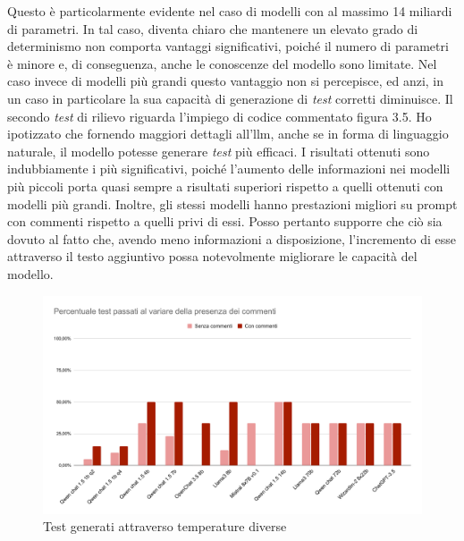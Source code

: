     Questo è particolarmente evidente nel caso di modelli con al massimo 14 miliardi di parametri. 
    In tal caso, diventa chiaro che mantenere un elevato grado di determinismo non comporta vantaggi significativi, 
    poiché il numero di parametri è minore e, di conseguenza, anche le conoscenze del modello sono limitate. Nel caso invece 
    di modelli più grandi questo vantaggio non si percepisce, ed anzi, in un caso in particolare la sua capacità di generazione di \textit{test} corretti diminuisce.
    Il secondo \textit{test} di rilievo riguarda l'impiego di codice commentato figura 3.5. Ho ipotizzato che fornendo maggiori dettagli all'\gls{llm}, 
    anche se in forma di linguaggio naturale, il modello potesse generare \textit{test} più efficaci. I risultati ottenuti sono indubbiamente 
    i più significativi, poiché l'aumento delle informazioni nei modelli più piccoli porta quasi sempre a risultati superiori rispetto 
    a quelli ottenuti con modelli più grandi. Inoltre, gli stessi modelli hanno prestazioni migliori su prompt con commenti rispetto a
     quelli privi di essi. Posso pertanto supporre che ciò sia dovuto al fatto che, avendo meno informazioni a disposizione, l'incremento di esse 
     attraverso il testo aggiuntivo possa notevolmente migliorare le capacità del modello.
    \begin{figure}[!h]
        \centering        
        \includegraphics[width=14.5cm]{img/Percentuale test passati al variare della presenza dei commenti.pdf}
        \caption{Test generati attraverso temperature diverse}
    \end{figure}

